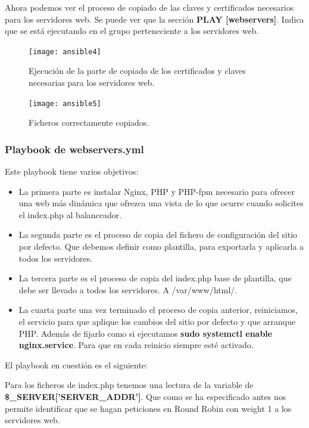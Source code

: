Ahora podemos ver el proceso de copiado de las claves y certificados necesarios para los servidores web. Se puede ver que la sección \textbf{PLAY [webservers]}. Indica que se está ejecutando en el grupo perteneciente a los servidores web.

\begin{figure}[H]
	\centering
	\texttt{[image: ansible4]}
	\caption{Ejecución de la parte de copiado de los certificados y claves necesarias para los servidores web.}
\end{figure}

\begin{figure}[H]
	\centering
	\texttt{[image: ansible5]}
	\caption{Ficheros correctamente copiados.}
\end{figure}

\newpage
\subsubsection{Playbook de webservers.yml}

Este playbook tiene varios objetivos:

\begin{itemize}
	\item La primera parte es instalar Nginx, PHP y PHP-fpm necesario para ofrecer una web más dinámica que ofrezca una vista de lo que ocurre cuando solicites el index.php al balanceador.
	\item La segunda parte es el proceso de copia del fichero de configuración del sitio por defecto. Que debemos definir como plantilla, para exportarla y aplicarla a todos los servidores.
	\item La tercera parte es el proceso de copia del index.php base de plantilla, que debe ser llevado a todos los servidores. A /var/www/html/.
	\item La cuarta parte una vez terminado el proceso de copia anterior, reiniciamos, el servicio para que aplique los cambios del sitio por defecto y que arranque PHP. Además de fijarlo como si ejecutamos \textbf{sudo systemctl enable nginx.service}. Para que en cada reinicio siempre esté activado.
\end{itemize}

El playbook en cuestión es el siguiente:



Para los ficheros de index.php tenemos una lectura de la variable de \textbf{\$\_SERVER['SERVER\_ADDR']}. Que como se ha especificado antes nos permite identificar que se hagan peticiones en Round Robin con weight 1 a los servidores web.

